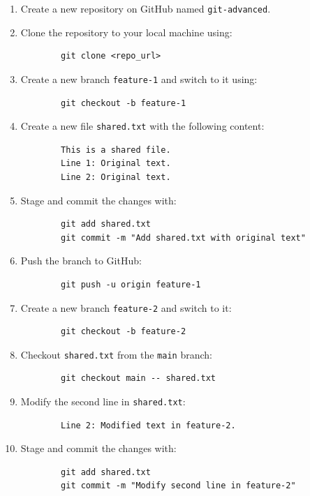 \documentclass[a4paper,12pt]{article}
\begin{document}
\begin{enumerate}
    \item Create a new repository on GitHub named \texttt{git-advanced}.
    \item Clone the repository to your local machine using: 
        \begin{verbatim}
        git clone <repo_url>
        \end{verbatim}
    \item Create a new branch \texttt{feature-1} and switch to it using:
        \begin{verbatim}
        git checkout -b feature-1
        \end{verbatim}
    \item Create a new file \texttt{shared.txt} with the following content:
        \begin{verbatim}
        This is a shared file.
        Line 1: Original text.
        Line 2: Original text.
        \end{verbatim}
    \item Stage and commit the changes with:
        \begin{verbatim}
        git add shared.txt
        git commit -m "Add shared.txt with original text"
        \end{verbatim}
    \item Push the branch to GitHub:
        \begin{verbatim}
        git push -u origin feature-1
        \end{verbatim}
    \item Create a new branch \texttt{feature-2} and switch to it:
        \begin{verbatim}
        git checkout -b feature-2
        \end{verbatim}
    \item Checkout \texttt{shared.txt} from the \texttt{main} branch:
        \begin{verbatim}
        git checkout main -- shared.txt
        \end{verbatim}
    \item Modify the second line in \texttt{shared.txt}:
        \begin{verbatim}
        Line 2: Modified text in feature-2.
        \end{verbatim}
    \item Stage and commit the changes with:
        \begin{verbatim}
        git add shared.txt
        git commit -m "Modify second line in feature-2"

\end{verbatim}
\end{enumerate}
\end{document}
